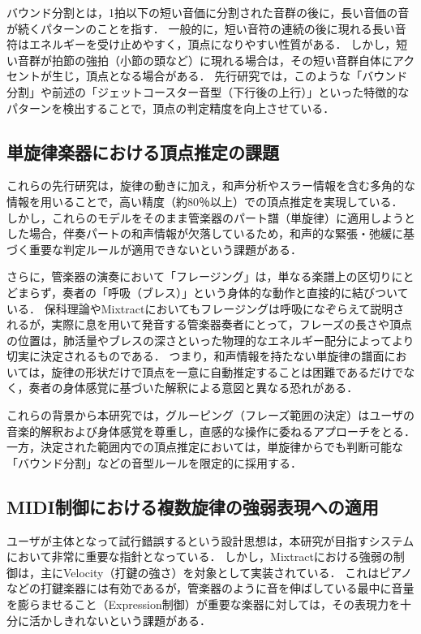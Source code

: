 バウンド分割とは，1拍以下の短い音価に分割された音群の後に，長い音価の音が続くパターンのことを指す．
一般的に，短い音符の連続の後に現れる長い音符はエネルギーを受け止めやすく，頂点になりやすい性質がある．
しかし，短い音群が拍節の強拍（小節の頭など）に現れる場合は，その短い音群自体にアクセントが生じ，頂点となる場合がある．
先行研究では，このような「バウンド分割」や前述の「ジェットコースター音型（下行後の上行）」といった特徴的なパターンを検出することで，頂点の判定精度を向上させている．

\subsection{単旋律楽器における頂点推定の課題}
これらの先行研究は，旋律の動きに加え，和声分析やスラー情報を含む多角的な情報を用いることで，高い精度（約80％以上）での頂点推定を実現している．
しかし，これらのモデルをそのまま管楽器のパート譜（単旋律）に適用しようとした場合，伴奏パートの和声情報が欠落しているため，和声的な緊張・弛緩に基づく重要な判定ルールが適用できないという課題がある．

さらに，管楽器の演奏において「フレージング」は，単なる楽譜上の区切りにとどまらず，奏者の「呼吸（ブレス）」という身体的な動作と直接的に結びついている．
保科理論やMixtractにおいてもフレージングは呼吸になぞらえて説明されるが，実際に息を用いて発音する管楽器奏者にとって，フレーズの長さや頂点の位置は，肺活量やブレスの深さといった物理的なエネルギー配分によってより切実に決定されるものである．
つまり，和声情報を持たない単旋律の譜面においては，旋律の形状だけで頂点を一意に自動推定することは困難であるだけでなく，奏者の身体感覚に基づいた解釈による意図と異なる恐れがある．

これらの背景から本研究では，グルーピング（フレーズ範囲の決定）はユーザの音楽的解釈および身体感覚を尊重し，直感的な操作に委ねるアプローチをとる．
一方，決定された範囲内での頂点推定においては，単旋律からでも判断可能な「バウンド分割」などの音型ルールを限定的に採用する．

\subsection{MIDI制御における複数旋律の強弱表現への適用}
ユーザが主体となって試行錯誤するという設計思想は，本研究が目指すシステムにおいて非常に重要な指針となっている．
しかし，Mixtractにおける強弱の制御は，主にVelocity（打鍵の強さ）を対象として実装されている．
これはピアノなどの打鍵楽器には有効であるが，管楽器のように音を伸ばしている最中に音量を膨らませること（Expression制御）が重要な楽器に対しては，その表現力を十分に活かしきれないという課題がある．

